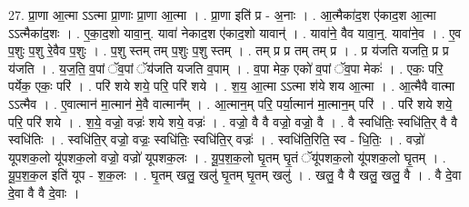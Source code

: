 \documentclass[17pt]{extarticle}
\begin{document}
27. प्रा॒णा आ॒त्मा ऽऽत्मा प्रा॒णाः प्रा॒णा आ॒त्मा । . प्रा॒णा इति॑ प्र - अ॒नाः । . आ॒त्मैका॑द॒श ए॑काद॒श आ॒त्मा ऽऽत्मैका॑द॒शः । . ए॒का॒द॒शो यावा॒न्॒. यावा॑ नेकाद॒श ए॑काद॒शो यावान्॑ । . यावा॑ने॒ वैव यावा॒न्॒. यावा॑ने॒व । . ए॒व प॒शुः प॒शु रे॒वैव प॒शुः । . प॒शु स्तम् तम् प॒शुः प॒शु स्तम् । . तम् प्र प्र तम् तम् प्र । . प्र य॑जति यजति॒ प्र प्र य॑जति । . य॒ज॒ति॒ व॒पां ॅव॒पां ॅय॑जति यजति व॒पाम् । . व॒पा मेक॒ एको॑ व॒पां ॅव॒पा मेकः॑ । . एकः॒ परि॒ पर्येक॒ एकः॒ परि॑ । . परि॑ शये शये॒ परि॒ परि॑ शये । . श॒य॒ आ॒त्मा ऽऽत्मा श॑ये शय आ॒त्मा । . आ॒त्मैवै वात्मा ऽऽत्मैव । . ए॒वात्मान॑ मा॒त्मान॑ मे॒वै वात्मान᳚म् । . आ॒त्मान॒म् परि॒ पर्या॒त्मान॑ मा॒त्मान॒म् परि॑ । . परि॑ शये शये॒ परि॒ परि॑ शये । . श॒ये॒ वज्रो॒ वज्रः॑ शये शये॒ वज्रः॑ । . वज्रो॒ वै वै वज्रो॒ वज्रो॒ वै । . वै स्वधि॑तिः॒ स्वधि॑ति॒र् वै वै स्वधि॑तिः । . स्वधि॑ति॒र् वज्रो॒ वज्रः॒ स्वधि॑तिः॒ स्वधि॑ति॒र् वज्रः॑ । . स्वधि॑ति॒रिति॒ स्व - धि॒तिः॒ । . वज्रो॑ यूपशक॒लो यू॑पशक॒लो वज्रो॒ वज्रो॑ यूपशक॒लः । . यू॒प॒श॒क॒लो घृ॒तम् घृ॒तं ॅयू॑पशक॒लो यू॑पशक॒लो घृ॒तम् । . यू॒प॒श॒क॒ल इति॑ यूप - श॒क॒लः । . घृ॒तम् खलु॒ खलु॑ घृ॒तम् घृ॒तम् खलु॑ । . खलु॒ वै वै खलु॒ खलु॒ वै । . वै दे॒वा दे॒वा वै वै दे॒वाः । \newline
\end{document}
